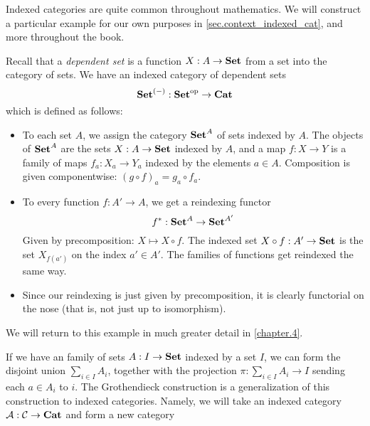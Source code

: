 \documentclass[DynamicalBook]{subfiles}
\begin{document}
Indexed categories are quite common throughout mathematics. We will construct a
particular example for our own purposes in \cref{sec.context_indexed_cat}, and
more throughout the book.

\begin{example}\label{ex.indexed_cat_of_dependent_sets}
  Recall that a \emph{dependent set} is a function $X : A \to \textbf{Set}$ from a set
  into the category of sets. We have an indexed category of dependent sets
  $$\textbf{Set}^{(-)} : \textbf{Set}^{\textnormal{op}} \to \textbf{Cat}$$
  which is defined as follows:
  \begin{itemize}
    \item To each set $A$, we assign the category $\textbf{Set}^A$ of sets indexed by
      $A$. The objects of $\textbf{Set}^A$ are the sets $X : A \to \textbf{Set}$ indexed by
      $A$, and a map $f : X \to Y$ is a family of maps $f_a : X_a \to Y_a$
      indexed by the elements $a \in A$. Composition is given componentwise: $(g
      \circ f)_a = g_a \circ f_a$.
    \item To every function $f : A' \to A$, we get a reindexing functor
$$f^{\ast} : \textbf{Set}^A \to \textbf{Set}^{A'}$$
   Given by precomposition: $X \mapsto X \circ f$. The indexed set $X \circ f :
   A' \to \textbf{Set}$ is the set $X_{f(a')}$ on the index $a' \in A'$. The families
   of functions get reindexed the same way.
     \item Since our reindexing is just given by precomposition, it is clearly
       functorial on the nose (that is, not just up to isomorphism).
  \end{itemize}
  We will return to this example in much greater detail in \cref{chapter.4}.
\end{example} 


If we have an family of sets $A : I \to \textbf{Set}$ indexed by a set $I$, we can
form the disjoint union $\sum_{i \in I} A_i$, together with the projection $\pi
: \sum_{i \in I} A_i \to I$ sending each $a \in A_i$ to $i$. The Grothendieck
construction is a generalization of this construction to indexed categories. Namely, we will take an indexed category $\mathcal{A}
: \mathcal{C} \to \textbf{Cat}$ and form a new category
\end{document}
